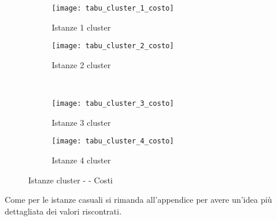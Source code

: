 \begin{figure}[H]
	\centering
	\begin{subfigure}[b]{.45\textwidth}
		\texttt{[image: tabu\_cluster\_1\_costo]}
		\caption{Istanze 1 cluster}
		\label{fig:tabu cluster 1 costo}
	\end{subfigure}
	\quad
	\begin{subfigure}[b]{.45\textwidth}
		\texttt{[image: tabu\_cluster\_2\_costo]}
		\caption{Istanze 2 cluster}
		\label{fig:tabu cluster 2 costo}
	\end{subfigure}
	\\
	\begin{subfigure}[b]{.45\textwidth}
		\texttt{[image: tabu\_cluster\_3\_costo]}
		\caption{Istanze 3 cluster}
		\label{fig:tabu cluster 3 costo}
	\end{subfigure}
	\quad
	\begin{subfigure}[b]{.45\textwidth}
		\texttt{[image: tabu\_cluster\_4\_costo]}
		\caption{Istanze 4 cluster}
		\label{fig:tabu cluster 4 costo}
	\end{subfigure}
	\caption{Istanze cluster - \tabu{} - Costi}
	\label{fig: tabu cluster costo}
\end{figure}

Come per le istanze casuali si rimanda all'appendice per avere un'idea più dettagliata dei valori riscontrati.

